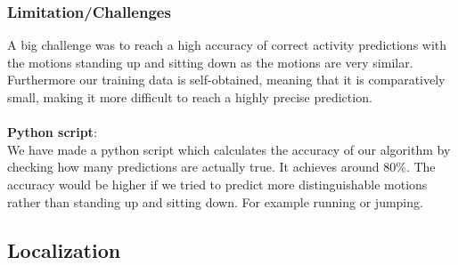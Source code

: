 \documentclass[12pt]{article}
\begin{document}
\pagebreak

\subsubsection{Limitation/Challenges}
A big challenge was to reach a high accuracy of correct activity predictions with the motions standing up and sitting down as the motions are very similar.
Furthermore our training data is self-obtained, meaning that it is comparatively small, making it more difficult to reach a highly precise prediction.
\\\\
\textbf{Python script}:\\
We have made a python script which calculates the accuracy of our algorithm by checking how many predictions are actually true. It achieves around \(80\%\). The accuracy would be higher if we tried to predict more distinguishable motions rather than standing up and sitting down. For example running or jumping.

\subsection{Localization} \label{sec:localization}
\end{document}
